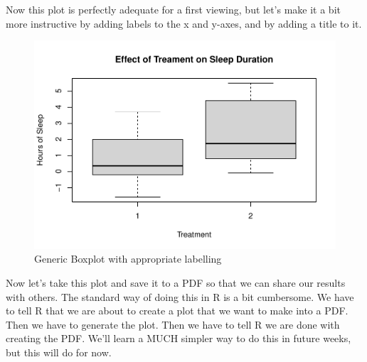\documentclass[
]{book}
\newenvironment{Shaded}{\begin{snugshade}}{\end{snugshade}}
\newcommand{\AttributeTok}[1]{\textcolor[rgb]{0.13,0.29,0.53}{#1}}
\newcommand{\CommentTok}[1]{\textcolor[rgb]{0.56,0.35,0.01}{\textit{#1}}}
\newcommand{\FunctionTok}[1]{\textcolor[rgb]{0.13,0.29,0.53}{\textbf{#1}}}
\newcommand{\NormalTok}[1]{#1}
\newcommand{\SpecialCharTok}[1]{\textcolor[rgb]{0.81,0.36,0.00}{\textbf{#1}}}
\newcommand{\StringTok}[1]{\textcolor[rgb]{0.31,0.60,0.02}{#1}}
\begin{document}
Now this plot is perfectly adequate for a first viewing, but let's make it a bit more instructive by adding labels to the x and y-axes, and by adding a title to it.

\begin{Shaded}
\end{Shaded}

\begin{figure}
\centering
\includegraphics{rintro_demo_files/figure-latex/unnamed-chunk-25-1.pdf}
\caption{\label{fig:unnamed-chunk-25}Generic Boxplot with appropriate labelling}
\end{figure}

Now let's take this plot and save it to a PDF so that we can share our results with others. The standard way of doing this in R is a bit cumbersome. We have to tell R that we are about to create a plot that we want to make into a PDF. Then we have to generate the plot. Then we have to tell R we are done with creating the PDF. We'll learn a MUCH simpler way to do this in future weeks, but this will do for now.
\end{document}
